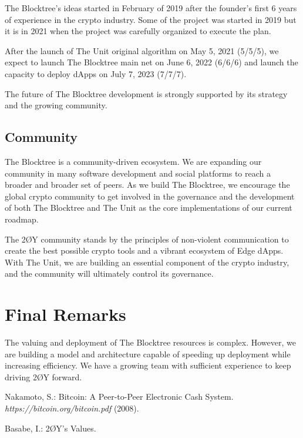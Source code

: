 \documentclass[12pt]{article}
\begin{document}
The Blocktree's ideas started in February of 2019 after the founder's first 6 years of experience in the crypto industry. Some of the project was started in 2019 but it is in 2021 when the project was carefully organized to execute the plan.

After the launch of The Unit original algorithm on May 5, 2021 (5/5/5), we expect to launch The Blocktree main net on June 6, 2022 (6/6/6) and launch the capacity to deploy dApps on July 7, 2023 (7/7/7).

The future of The Blocktree development is strongly supported by its strategy and the growing community.


\subsection{Community}

The Blocktree is a community-driven ecosystem. We are expanding our community in many software development and social platforms to reach a broader and broader set of peers. As we build The Blocktree, we encourage the global crypto community to get involved in the governance and the development of both The Blocktree and The Unit as the core implementations of our current roadmap.

The 2ØY community stands by the principles of non-violent communication to create the best possible crypto tools and a vibrant ecosystem of Edge dApps. With The Unit, we are building an essential component of the crypto industry, and the community will ultimately control its governance.

\section{Final Remarks}

The valuing and deployment of The Blocktree resources is complex. However, we are building a model and architecture capable of speeding up deployment while increasing efficiency. We have a growing team with sufficient experience to keep driving 2ØY forward.


\begin{thebibliography}{[BLSWZ9]}


 Nakamoto, S.: Bitcoin: A Peer-to-Peer Electronic Cash System. \emph{https://bitcoin.org/bitcoin.pdf} (2008).


 Basabe, I.: 2ØY's Values.



\end{thebibliography}
\end{document}
